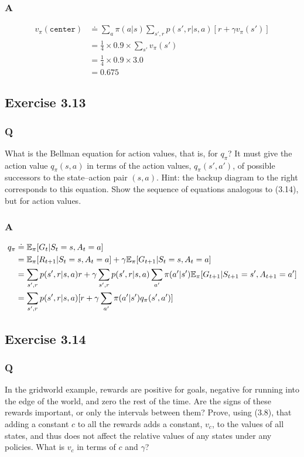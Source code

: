 \subsubsection*{A}
\begin{align*}
    v_\pi(\mathtt{center}) &\doteq \sum_a \pi(a | s) \sum_{s', r} p(s', r | s, a)[r + \gamma v_\pi(s')] \\
    & = \frac14 \times 0.9 \times \sum_{s'} v_\pi(s')\\
    & = \frac14 \times 0.9 \times 3.0 \\
    & = 0.675
\end{align*}


\subsection{Exercise 3.13}
\subsubsection*{Q}
What is the Bellman equation for action values, that is, for $q_\pi$? It must give the action value $q_\pi(s, a)$ in terms of the action values, $q_\pi(s',a')$, of possible successors to the state–action pair $(s,a)$. Hint: the backup diagram to the right corresponds to this equation. Show the sequence of equations analogous to (3.14), but for action values.

\subsubsection*{A}
\begin{align*}
    q_\pi &\doteq \mathbb{E}_{\pi}[G_t | S_t=s, A_t=a]\\
          &= \mathbb{E}_{\pi}[R_{t+1}| S_t=s, A_t=a] + \gamma \mathbb{E}_{\pi}[G_{t+1} |S_t = s, A_t = a] \\
          &= \sum_{s', r} p(s', r|s, a)r + \gamma \sum_{s', r} p(s', r|s, a) \sum_{a'}\pi(a'|s')\mathbb{E}_{\pi}[G_{t+1}| S_{t+1}=s', A_{t+1}=a'] \\
          &= \sum_{s', r} p(s', r| s, a) [r + \gamma \sum_{a'}\pi(a'|s')q_\pi(s', a')]
\end{align*}


\subsection{Exercise 3.14}
\subsubsection*{Q}
In the gridworld example, rewards are positive for goals, negative for running into the edge of the world, and zero the rest of the time. Are the signs of these rewards important, or only the intervals between them? Prove, using (3.8), that adding a constant $c$ to all the rewards adds a constant, $v_c$, to the values of all states, and thus does not affect the relative values of any states under any policies. What is $v_c$ in terms of $c$ and $\gamma$?

